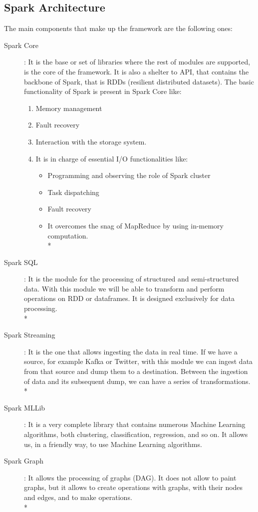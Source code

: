 \subsection{Spark Architecture}

The main components that make up the framework are the following ones:

\begin{description}

	\item[Spark Core]: It is the base or set of libraries where the rest of modules are supported, is the core of the framework. It is also a shelter to API, that contains the backbone of Spark, that is RDDs (resilient distributed datasets). The basic functionality of Spark is present in Spark Core like:
	\begin{enumerate}
		\item Memory management
		\item Fault recovery
		\item Interaction with the storage system.
		\item It is in charge of essential I/O functionalities like:
		\begin{itemize}
			\item Programming and observing the role of Spark cluster
			\item Task dispatching
			\item Fault recovery
			\item It overcomes the snag of MapReduce by using in-memory computation.\\*
		\end{itemize}
	\end{enumerate}

	

	
	
	\item[Spark SQL]: It is the module for the processing of structured and semi-structured data. With this module we will be able to transform and perform operations on RDD or dataframes. It is designed exclusively for data processing.\\*
	
	
	\item[Spark Streaming]: It is the one that allows ingesting the data in real time. If we have a source, for example Kafka or Twitter, with this module we can ingest data from that source and dump them to a destination. Between the ingestion of data and its subsequent dump, we can have a series of transformations.\\*
	
	
	\item[Spark MLLib]: It is a very complete library that contains numerous Machine Learning algorithms, both clustering, classification, regression, and so on. It allows us, in a friendly way, to use Machine Learning algorithms.
	
	
	\item[Spark Graph]: It allows the processing of graphs (DAG). It does not allow to paint graphs, but it allows to create operations with graphs, with their nodes and edges, and to make operations.\\*
	
\end{description}


